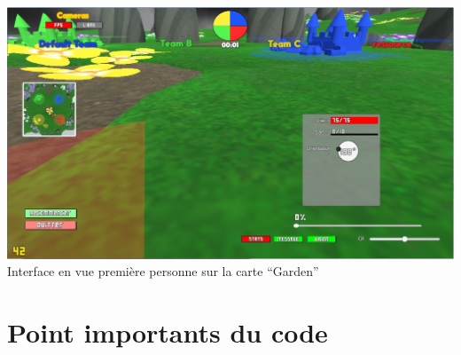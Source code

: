 \documentclass{report}
\begin{document}
\paragraph{}

\paragraph{}
\begin{adjustwidth}{-3em}{-3em}
\begin{center}
\includegraphics[scale=0.3]{DATA/enjeufps.png}
 {Interface en vue première personne sur la carte “Garden”}
\end{center}
\end{adjustwidth}
\paragraph{}


\section{Point importants du code}
\end{document}
